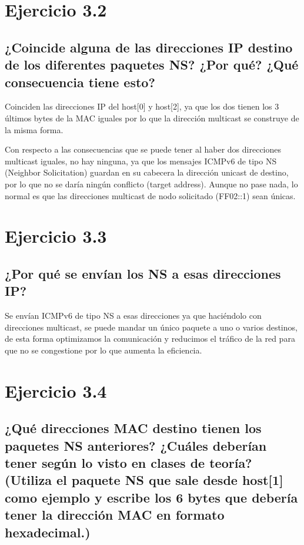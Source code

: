 \section{Ejercicio 3.2}
\subsection{¿Coincide alguna de las direcciones IP destino de los diferentes paquetes NS? ¿Por qué? ¿Qué consecuencia
tiene esto?}

Coinciden las direcciones IP del host[0] y host[2], ya que los dos tienen los 3 últimos bytes de la MAC iguales por lo que la dirección multicast se construye de la misma forma.

Con respecto a las consecuencias que se puede tener al haber dos direcciones multicast iguales, no hay ninguna, ya que los mensajes ICMPv6 de tipo NS (Neighbor Solicitation) guardan en su cabecera la dirección unicast de destino, por lo que no se daría ningún conflicto (target address). Aunque no pase nada, lo normal es que las direcciones multicast de nodo solicitado (FF02::1) sean únicas.


\section{Ejercicio 3.3}
\subsection{¿Por qué se envían los NS a esas direcciones IP?}

Se envían ICMPv6 de tipo NS a esas direcciones ya que haciéndolo con direcciones multicast, se puede mandar un único paquete a uno o varios destinos, de esta forma optimizamos la comunicación y reducimos el tráfico de la red para que no se congestione por lo que aumenta la eficiencia. 


\section{Ejercicio 3.4}
\subsection{¿Qué direcciones MAC destino tienen los paquetes NS anteriores? ¿Cuáles deberían tener según lo visto en
clases de teoría? (Utiliza el paquete NS que sale desde host[1] como ejemplo y escribe los 6 bytes que debería
tener la dirección MAC en formato hexadecimal.)}

